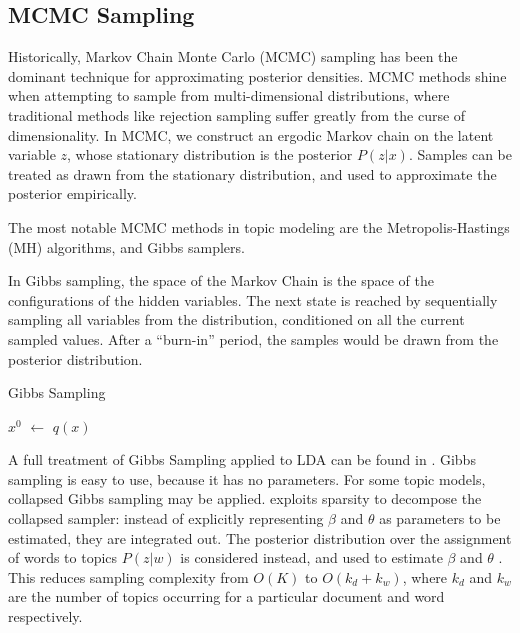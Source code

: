 \documentclass[letterpaper]{article}
\begin{document}
\subsection{MCMC Sampling}
\label{subsec:mcmc-sampling}
Historically, Markov Chain Monte Carlo (MCMC) sampling has been the
dominant technique for approximating posterior densities. MCMC methods
shine when attempting to sample from multi-dimensional distributions,
where traditional methods like rejection sampling suffer greatly from
the curse of dimensionality. In MCMC, we construct an ergodic Markov
chain on the latent variable $z$, whose stationary distribution is the
posterior $P( z | x)$. Samples can be treated as drawn from the
stationary distribution, and used to approximate the posterior
empirically.

The most notable MCMC methods in topic modeling are the
Metropolis-Hastings (MH) algorithms, and Gibbs samplers.

In Gibbs sampling, the space of the Markov Chain is the space of the
configurations of the hidden variables. The next state is reached by
sequentially sampling all variables from the distribution, conditioned
on all the current sampled values. After a ``burn-in'' period, the
samples would be drawn from the posterior distribution.

\begin{algorithm}
\caption{Gibbs Sampling}\label{alg:gibbs}
\begin{algorithmic}[1]
  \State $x^{0}$ $\gets$ $q(x)$
  \EndFor
  \EndFor
\end{algorithmic}
\end{algorithm}

A full treatment of Gibbs Sampling applied to LDA can be found in
\cite{griffiths2002gibbs}. Gibbs sampling is easy to use, because it
has no parameters. For some topic models, collapsed Gibbs sampling may
be applied. \citeauthor{griffiths2004finding} exploits sparsity to
decompose the collapsed sampler: instead of explicitly representing
$\beta$ and $\theta$ as parameters to be estimated, they are
integrated out. The posterior distribution over the assignment of
words to topics $P(z|w)$ is considered instead, and used to estimate
$\beta$ and $\theta$ \cite{griffiths2004finding}. This reduces
sampling complexity from $O(K)$ to $O(k_d + k_w)$, where $k_d$ and
$k_w$ are the number of topics occurring for a particular document and
word respectively.
\end{document}
